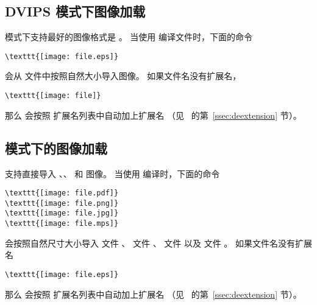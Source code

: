 \subsection{DVIPS 模式下图像加载}
 模式下支持最好的图像格式是 。
当使用  编译文件时，下面的命令
\begin{lstlisting}
\texttt{[image: file.eps]}
\end{lstlisting}
会从  文件中按照自然大小导入图像。
如果文件名没有扩展名，
\begin{lstlisting}
\texttt{[image: file]}
\end{lstlisting}
那么  会按照  扩展名列表中自动加上扩展名
（见~\pageref{ssec:deextension} 的第~\ref{ssec:deextension} 节）。

\subsection[pdfLaTeX 模式下的图像加载]{\pdfLaTeX{} 模式下的图像加载}
\pdfTeX{} 支持直接导入 、、 和 \MetaPost{} 图像。
当使用  编译时，下面的命令
\begin{lstlisting}
\texttt{[image: file.pdf]}
\texttt{[image: file.png]}
\texttt{[image: file.jpg]}
\texttt{[image: file.mps]}
\end{lstlisting}
会按照自然尺寸大小导入  文件 、
 文件 、
 文件 
以及 \MetaPost{} 文件 。
如果文件名没有扩展名
\begin{lstlisting}
\texttt{[image: file.eps]}
\end{lstlisting}
那么  会按照  扩展名列表中自动加上扩展名
（见~\pageref{ssec:deextension} 的第~\ref{ssec:deextension} 节）。

